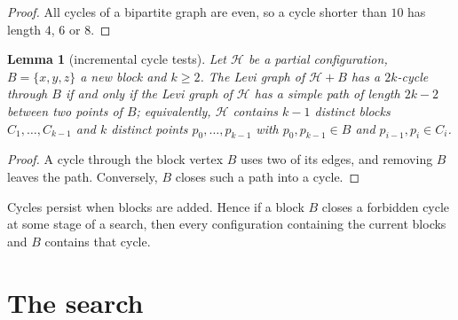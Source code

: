 \documentclass[11pt]{amsart}
\newtheorem{lemma}[theorem]{Lemma}
\theoremstyle{definition}
\theoremstyle{remark}
\begin{document}
\begin{proof}
All cycles of a bipartite graph are even, so a cycle shorter than $10$ has
length $4$, $6$ or $8$.
\end{proof}

\begin{lemma}[incremental cycle tests]\label{lem:incremental}
Let $\mathcal H$ be a partial configuration, $B=\{x,y,z\}$ a new block and
$k\ge 2$. The
Levi graph of $\mathcal H+B$ has a $2k$-cycle through $B$ if and only if the Levi
graph of $\mathcal H$ has a simple path of length $2k-2$ between two points of
$B$; equivalently, $\mathcal H$ contains $k-1$ distinct blocks
$C_1,\dots,C_{k-1}$ and $k$ distinct points $p_0,\dots,p_{k-1}$ with
$p_0,p_{k-1}\in B$ and $p_{i-1},p_i\in C_i$.
\end{lemma}

\begin{proof}
A cycle through the block vertex $B$ uses two of its edges, and removing $B$
leaves the path. Conversely, $B$ closes such a path into a cycle.
\end{proof}

Cycles persist when blocks are added. Hence if a block $B$ closes a forbidden
cycle at some stage of a search, then every configuration containing the
current blocks and $B$ contains that cycle.

\section{The search}\label{sec:search}
\end{document}
